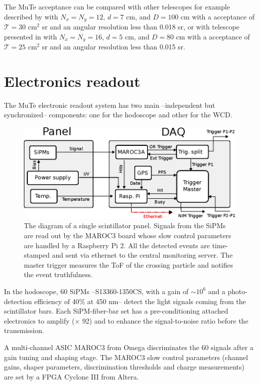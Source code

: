 \documentclass[letterpaper,11pt]{article}
\begin{document}
The MuTe acceptance can be compared with other telescopes for example described by \cite{UchidaTanakaTanaka2009space} with $N_x=N_y=12$, $d=7$ cm, and $D=100$ cm with a acceptance of $\mathcal{T}=30$ cm$^{2}$ sr and an angular resolution less than 0.018 sr, or with telescope presented in \cite{LesparreEtal2010} with $N_x=N_y=16$, $d=5$ cm, and $D=80$ cm with a acceptance of $\mathcal{T}=25$ cm$^{2}$ sr and an angular resolution less than 0.015 sr.  

\section{Electronics readout}
\label{daq}
The MuTe electronic readout system has two main --independent but synchronized-- components: one for the hodoscope and other for the WCD. 

\begin{figure}[htb]
\centering
\includegraphics[width=0.8\columnwidth]{Figures/DAQ.eps}
\caption{The diagram of a single scintillator panel. Signals from the SiPMs are read out by the MAROC3 board whose slow control parameters are handled by a Raspberry Pi 2. All the detected events are time-stamped and sent via ethernet to the central monitoring server. The master trigger measures the ToF of the crossing particle and notifies the event truthfulness.}
  \label{fig:scintillatordetector1}
\end{figure}

In the hodoscope, 60 SiPMs --S13360-1350CS, with a gain of $\sim 10^6$ and a photo-detection efficiency of 40$\%$ at 450 nm-- detect the light signals coming from the scintillator bars. Each SiPM-fiber-bar set has a pre-conditioning attached electronics to amplify ($\times$ 92) and to enhance the signal-to-noise ratio before the transmission. 

A multi-channel ASIC MAROC3 from Omega discriminates the 60 signals after a gain tuning and shaping stage. The MAROC3 slow control parameters (channel gains, shaper parameters, discrimination thresholds and charge measurements) are set by a FPGA Cyclone III from Altera.
\end{document}
